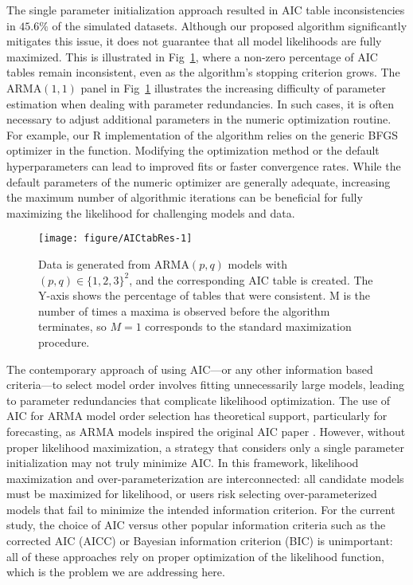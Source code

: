 The single parameter initialization approach resulted in AIC table inconsistencies in $45.6\%$ of the simulated datasets.
Although our proposed algorithm significantly mitigates this issue, it does not guarantee that all model likelihoods are fully maximized.
This is illustrated in Fig~\ref{fig:AICtabRes}, where a non-zero percentage of AIC tables remain inconsistent, even as the algorithm's stopping criterion grows.
The ARMA$(1, 1)$ panel in Fig~\ref{fig:AICtabRes} illustrates the increasing difficulty of parameter estimation when dealing with parameter redundancies.
In such cases, it is often necessary to adjust additional parameters in the numeric optimization routine.
For example, our R implementation of the algorithm relies on the generic BFGS optimizer in the  function.
Modifying the optimization method or the default hyperparameters can lead to improved fits or faster convergence rates.
While the default parameters of the numeric optimizer are generally adequate, increasing the maximum number of algorithmic iterations can be beneficial for fully maximizing the likelihood for challenging models and data. 

\begin{figure}[!ht]
\begin{knitrout}
\color{fgcolor}

{\centering \texttt{[image: figure/AICtabRes-1]} 

}


\end{knitrout}
\caption{\label{fig:AICtabRes}Data is generated from ARMA$(p, q)$ models with $(p, q) \in \{1, 2, 3\}^2$, and the corresponding AIC table is created. The Y-axis shows the percentage of tables that were consistent. M is the number of times a maxima is observed before the algorithm terminates, so $M=1$ corresponds to the standard maximization procedure.}
\end{figure}

The contemporary approach of using AIC---or any other information based criteria---to select model order involves fitting unnecessarily large models, leading to parameter redundancies that complicate likelihood optimization.
The use of AIC for ARMA model order selection has theoretical support, particularly for forecasting, as ARMA models inspired the original AIC paper \cite{aic74}.
However, without proper likelihood maximization, a strategy that considers only a single parameter initialization may not truly minimize AIC.
In this framework, likelihood maximization and over-parameterization are interconnected: all candidate models must be maximized for likelihood, or users risk selecting over-parameterized models that fail to minimize the intended information criterion.
For the current study, the choice of AIC versus other popular information criteria such as the corrected AIC (AICC) or Bayesian information criterion (BIC) is unimportant: all of these approaches rely on proper optimization of the likelihood function, which is the problem we are addressing here. 

